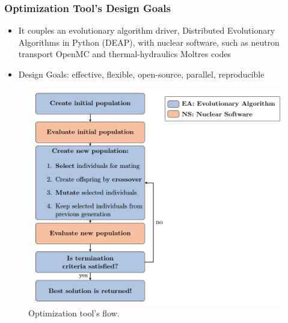 \begin{frame}
    \frametitle{Optimization Tool's Design Goals}
    \begin{minipage}[c]{0.45\textwidth}
    \begin{itemize}
        \item It couples an evolutionary algorithm driver, Distributed 
        Evolutionary Algorithms in Python (DEAP), with 
        nuclear software, such as neutron transport OpenMC and thermal-hydraulics 
        Moltres codes
        \item Design Goals: effective, flexible, open-source, parallel,
        reproducible
    \end{itemize}
    \end{minipage}\hfill
    \begin{minipage}[c]{0.55\textwidth}
        \centering
        \begin{figure}
            \includegraphics[width=\linewidth]{figures/rollo-flow.png} 
            \caption{Optimization tool's flow.}
        \end{figure}
    \end{minipage}

\end{frame}

